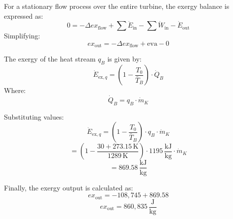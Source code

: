 For a stationary flow process over the entire turbine, the exergy balance is expressed as:  
\[
0 = -\Delta ex_{\text{flow}} + \sum \dot{E}_{\text{in}} - \sum \dot{W}_{\text{in}} - \dot{E}_{\text{out}}
\]  
Simplifying:  
\[
ex_{\text{out}} = -\Delta ex_{\text{flow}} + \text{eva} - 0
\]  

The exergy of the heat stream \( q_B \) is given by:  
\[
\dot{E}_{\text{ex},q} = \left(1 - \frac{T_0}{\bar{T}_B}\right) \cdot \dot{Q}_B
\]  
Where:  
\[
\dot{Q}_B = q_B \cdot \dot{m}_K
\]  

Substituting values:  
\[
\dot{E}_{\text{ex},q} = \left(1 - \frac{T_0}{\bar{T}_B}\right) \cdot q_B \cdot \dot{m}_K
\]  
\[
= \left(1 - \frac{30 + 273.15 \, \text{K}}{1289 \, \text{K}}\right) \cdot 1195 \, \frac{\text{kJ}}{\text{kg}} \cdot \dot{m}_K
\]  
\[
= 869.58 \, \frac{\text{kJ}}{\text{kg}}
\]  

Finally, the exergy output is calculated as:  
\[
ex_{\text{out}} = -108,745 + 869.58
\]  
\[
ex_{\text{out}} = 860,835 \, \frac{\text{J}}{\text{kg}}
\]